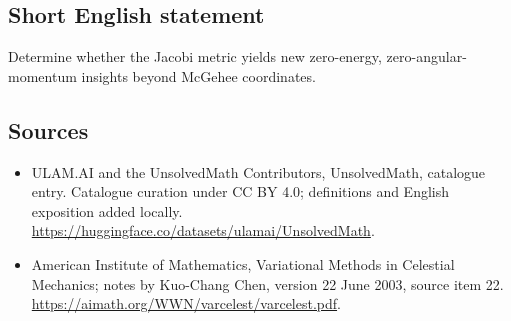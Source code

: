 \documentclass[11pt]{article}
\begin{document}
\subsection{Short English statement}
Determine whether the Jacobi metric yields new zero-energy, zero-angular-momentum insights beyond McGehee coordinates.
\subsection{Sources}
\begin{itemize}
\item[\hypertarget{source:statement:1}{S1}] ULAM.AI and the UnsolvedMath Contributors, UnsolvedMath, catalogue entry. Catalogue curation under CC BY 4.0; definitions and English exposition added locally.
\url{https://huggingface.co/datasets/ulamai/UnsolvedMath}.
\item[\hypertarget{source:statement:2}{S2}] American Institute of Mathematics, Variational Methods in Celestial Mechanics; notes by Kuo-Chang Chen, version 22 June 2003, source item 22.
\url{https://aimath.org/WWN/varcelest/varcelest.pdf}.
\end{itemize}
\label{end:statement}
\end{document}
